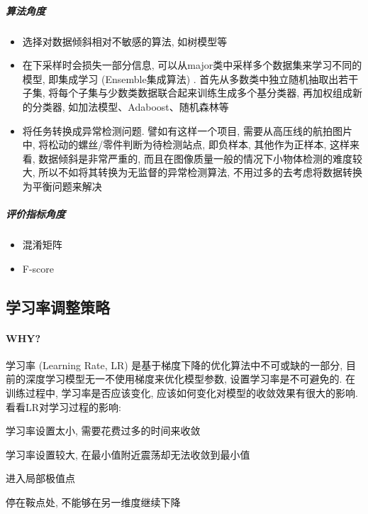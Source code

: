 \subparagraph{算法角度}
\begin{itemize}
	\item 选择对数据倾斜相对不敏感的算法, 如树模型等
	\item 在下采样时会损失一部分信息, 可以从major类中采样多个数据集来学习不同的模型, 即集成学习 (Ensemble集成算法) . 首先从多数类中独立随机抽取出若干子集, 将每个子集与少数类数据联合起来训练生成多个基分类器, 再加权组成新的分类器, 如加法模型、Adaboost、随机森林等
	\item 将任务转换成异常检测问题. 譬如有这样一个项目, 需要从高压线的航拍图片中, 将松动的螺丝/零件判断为待检测站点, 即负样本, 其他作为正样本, 这样来看, 数据倾斜是非常严重的, 而且在图像质量一般的情况下小物体检测的难度较大, 所以不如将其转换为无监督的异常检测算法, 不用过多的去考虑将数据转换为平衡问题来解决
\end{itemize}

\subparagraph{评价指标角度}
\begin{itemize}
	\item 混淆矩阵
	\item F-score
\end{itemize}

\subsection{学习率调整策略}
\paragraph{WHY?}学习率 (Learning Rate, LR) 是基于梯度下降的优化算法中不可或缺的一部分, 目前的深度学习模型无一不使用梯度来优化模型参数, 设置学习率是不可避免的. 在训练过程中, 学习率是否应该变化, 应该如何变化对模型的收敛效果有很大的影响. 看看LR对学习过程的影响: 
\begin{myitemize}
	\item 学习率设置太小, 需要花费过多的时间来收敛
	\item 学习率设置较大, 在最小值附近震荡却无法收敛到最小值
	\item 进入局部极值点
	\item 停在鞍点处, 不能够在另一维度继续下降
\end{myitemize}


